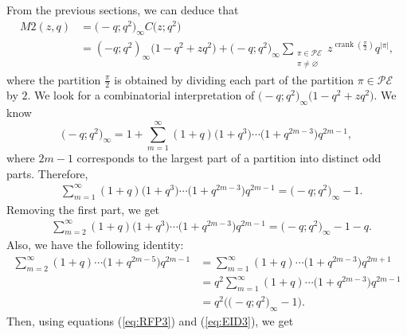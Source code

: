 \documentclass[pdftex]{sigma}
\numberwithin{equation}{section}
\newcommand\mylabel[1]{\label{#1}}
\newcommand\eqn[1]{(\ref{eq:#1})}
\begin{document}
From the previous sections, we can deduce that
\begin{align*}
M2(z,q)&=\bigl(-q;q^2\bigr)_{\infty} C\bigl(z;q^2\bigr)
\\
&=(-q;q^2)_{\infty} \bigl(1-q^2+zq^2\bigr)+\bigl(-q;q^2\bigr)_{\infty} \sum\limits_{\substack{{\pi \in \mathcal{PE}}\\ \pi \neq \varnothing}}z^{\operatorname{crank}(\frac{\pi}{2})}q^{|\pi|},
\end{align*}
where the partition $\frac{\pi}{2}$ is obtained by dividing each part of the partition $\pi \in \mathcal{PE}$ by $2$. We look for a combinatorial interpretation of $\bigl(-q;q^2\bigr)_{\infty}\bigl(1-q^2+zq^2\bigr)$. We know
\begin{equation*}%
\bigl(-q;q^2\bigr)_{\infty}=1+\sum\limits_{m=1}^{\infty}(1+q)\bigl(1+q^3\bigr)\cdots\bigl(1+q^{2m-3}\bigr)q^{2m-1},
\end{equation*}
where $2m-1$ corresponds to the largest part of a partition into distinct odd parts. Therefore,
\begin{align*}
&\sum\limits_{m=1}^{\infty}(1+q)\bigl(1+q^3\bigr)\cdots\bigl(1+q^{2m-3}\bigr)q^{2m-1}=\bigl(-q;q^2\bigr)_{\infty}-1.
\end{align*}
Removing the first part, we get
\begin{align}
\mylabel{eq:RFP3}
&\sum\limits_{m=2}^{\infty}(1+q)\bigl(1+q^3\bigr)\cdots\bigl(1+q^{2m-3}\bigr)q^{2m-1}=\bigl(-q;q^2\bigr)_{\infty}-1-q.
\end{align}
Also, we have the following identity:
\begin{align}
\nonumber
\sum\limits_{m=2}^{\infty}(1+q)\cdots\bigl(1+q^{2m-5}\bigr)q^{2m-1}&=\sum\limits_{m=1}^{\infty}(1+q)\cdots\bigl(1+q^{2m-3}\bigr)q^{2m+1}
\\
\nonumber
&=q^2\sum\limits_{m=1}^{\infty}(1+q)\cdots\bigl(1+q^{2m-3}\bigr)q^{2m-1}
\\
\mylabel{eq:EID3}
&=q^2\bigl(\bigl(-q;q^2\bigr)_{\infty}-1\bigr).
\end{align}
Then, using equations \eqn{RFP3} and \eqn{EID3}, we get
\end{document}
